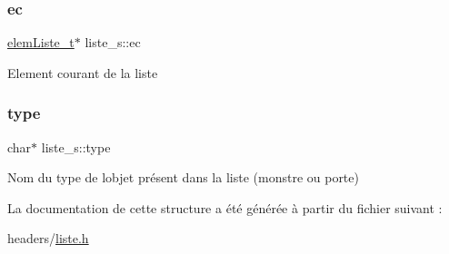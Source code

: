 \subsubsection{\texorpdfstring{ec}{ec}}
{\footnotesize\ttfamily \hyperlink{structelem_liste__s}{elem\+Liste\+\_\+t}$\ast$ liste\+\_\+s\+::ec}

Element courant de la liste \mbox{\label{structliste__s_a85b56be0222a73dfde956aae220b6331}} 
\subsubsection{\texorpdfstring{type}{type}}
{\footnotesize\ttfamily char$\ast$ liste\+\_\+s\+::type}

Nom du type de l\textquotesingle{}objet présent dans la liste (monstre ou porte) 

La documentation de cette structure a été générée à partir du fichier suivant \+:\begin{DoxyCompactItemize}
\item 
headers/\hyperlink{liste_8h}{liste.\+h}\end{DoxyCompactItemize}

